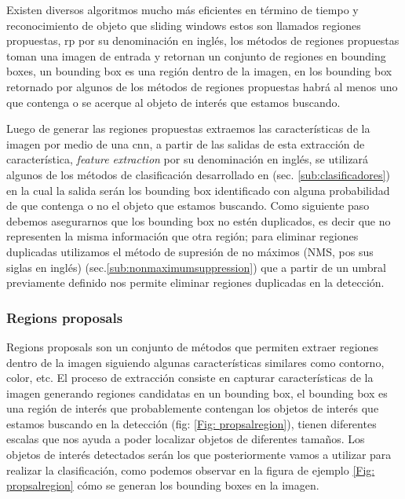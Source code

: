 Existen diversos algoritmos mucho más eficientes en término de tiempo y reconocimiento de objeto que sliding windows estos son llamados regiones propuestas, \ac{rp} por su denominación en inglés, los métodos de regiones propuestas toman una imagen de entrada y retornan un conjunto de regiones en bounding boxes, un bounding box es una región dentro de la imagen, en los bounding box retornado por algunos de los métodos de regiones propuestas habrá al menos uno que contenga o se acerque al objeto de interés que estamos buscando.

Luego de generar las regiones propuestas extraemos las características de la imagen por medio de una \ac{cnn}, a partir de las salidas de esta extracción de característica, \textit{feature extraction} por su denominación en inglés, se utilizará algunos de los métodos de clasificación desarrollado en (sec. \ref{sub:clasificadores}) en la cual la salida serán los bounding box identificado con alguna probabilidad de que contenga o no el objeto que estamos buscando. Como siguiente paso debemos  asegurarnos que los bounding box no estén duplicados, es decir que no representen la misma información que otra región; para eliminar regiones duplicadas utilizamos el método de supresión de no máximos (NMS, pos sus siglas en inglés) (sec.\ref{sub:nonmaximumsuppression}) que a partir de un umbral previamente definido nos permite eliminar regiones duplicadas en la detección.



\subsubsection{Regions proposals} \label{sub:regions-proposal}

Regions proposals son un conjunto de métodos que permiten extraer regiones dentro de la imagen siguiendo algunas características similares como contorno, color, etc. El proceso de extracción consiste en capturar características de la imagen generando regiones candidatas en un bounding box, el bounding box es una región de interés que probablemente contengan los objetos de interés que estamos buscando en la detección (fig: \ref{Fig: propsalregion}), tienen diferentes escalas que nos ayuda a poder localizar objetos de diferentes tamaños. Los objetos de interés detectados serán los que posteriormente vamos a utilizar para realizar la clasificación, como podemos observar en la figura de ejemplo \ref{Fig: propsalregion} cómo se generan los bounding boxes en la imagen.

